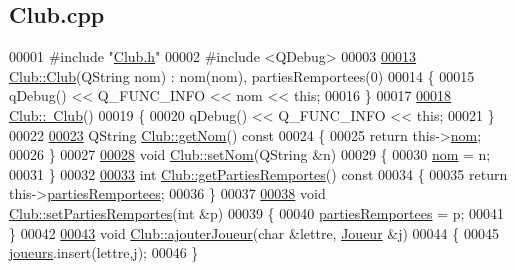 \hypertarget{_club_8cpp_source}{}\subsection{Club.\+cpp}

\begin{DoxyCode}
00001 \textcolor{preprocessor}{#include "\hyperlink{_club_8h}{Club.h}"}
00002 \textcolor{preprocessor}{#include <QDebug>}
00003 
\hyperlink{class_club_a6d6fa5971608a06394c40453289d6251}{00013} \hyperlink{class_club_a6d6fa5971608a06394c40453289d6251}{Club::Club}(QString nom) : nom(nom), partiesRemportees(0)
00014 \{
00015     qDebug() << Q\_FUNC\_INFO << nom << \textcolor{keyword}{this};
00016 \}
00017 
\hyperlink{class_club_a1c2993e141cfa6468284274359cc7de5}{00018} \hyperlink{class_club_a1c2993e141cfa6468284274359cc7de5}{Club::~Club}()
00019 \{
00020     qDebug() << Q\_FUNC\_INFO << \textcolor{keyword}{this};
00021 \}
00022 
\hyperlink{class_club_aaa3c96659bf305d7a1988ecbd27de30f}{00023} QString \hyperlink{class_club_aaa3c96659bf305d7a1988ecbd27de30f}{Club::getNom}()\textcolor{keyword}{ const}
00024 \textcolor{keyword}{}\{
00025     \textcolor{keywordflow}{return} this->\hyperlink{class_club_a18e1489d02110a82a0c8706f52091002}{nom};
00026 \}
00027 
\hyperlink{class_club_a6cb8e81d8cfd3d5febd6ce48e33ba94e}{00028} \textcolor{keywordtype}{void} \hyperlink{class_club_a6cb8e81d8cfd3d5febd6ce48e33ba94e}{Club::setNom}(QString &n)
00029 \{
00030     \hyperlink{class_club_a18e1489d02110a82a0c8706f52091002}{nom} = n;
00031 \}
00032 
\hyperlink{class_club_af4f28219aa51c3742cddfae4b66cec4b}{00033} \textcolor{keywordtype}{int} \hyperlink{class_club_af4f28219aa51c3742cddfae4b66cec4b}{Club::getPartiesRemportes}()\textcolor{keyword}{ const}
00034 \textcolor{keyword}{}\{
00035     \textcolor{keywordflow}{return} this->\hyperlink{class_club_a1c5dd1362656cb4829de483255ffc39a}{partiesRemportees};
00036 \}
00037 
\hyperlink{class_club_ad1711f2742e385ef00174b3ebd98b165}{00038} \textcolor{keywordtype}{void} \hyperlink{class_club_ad1711f2742e385ef00174b3ebd98b165}{Club::setPartiesRemportes}(\textcolor{keywordtype}{int} &p)
00039 \{
00040     \hyperlink{class_club_a1c5dd1362656cb4829de483255ffc39a}{partiesRemportees} = p;
00041 \}
00042 
\hyperlink{class_club_af7cf902fc29f6d587b11a10eec87edff}{00043} \textcolor{keywordtype}{void} \hyperlink{class_club_af7cf902fc29f6d587b11a10eec87edff}{Club::ajouterJoueur}(\textcolor{keywordtype}{char} &lettre, \hyperlink{class_joueur}{Joueur} &j)
00044 \{
00045     \hyperlink{class_club_a1546f281ba72a07e52cbfd2a60af699b}{joueurs}.insert(lettre,j);
00046 \}
\end{DoxyCode}

